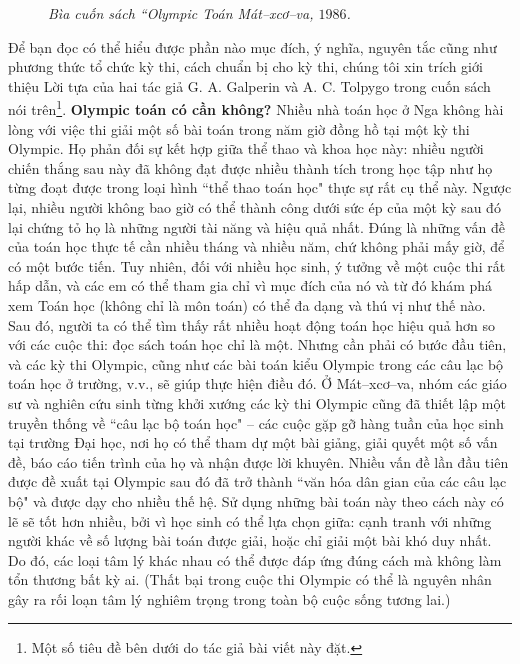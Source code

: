 \begin{multicols}{2}
\begin{figure}[H]
		\caption{\small\textit{\color{cackithi}Bìa cuốn sách ``Olympic Toán Mát--xcơ--va, $1986$.}}
		\vspace*{-10pt}
	\end{figure}
	Để bạn đọc có thể hiểu được phần nào mục đích, ý nghĩa, nguyên tắc cũng như phương thức tổ chức kỳ thi, cách chuẩn bị cho kỳ thi, chúng tôi xin trích giới thiệu Lời tựa của hai tác giả G. A. Galperin và A. C. Tolpygo trong cuốn sách nói trên\footnote[1]{\color{cackithi}Một số tiêu đề bên dưới do tác giả bài viết này đặt.}.
	\vskip 0.1cm
	\textbf{\color{cackithi}Olympic toán có cần không?}
	\vskip 0.1cm 
	Nhiều nhà toán học ở Nga không hài lòng với việc thi giải một số bài toán trong năm giờ đồng hồ tại một kỳ thi Olympic. Họ phản đối sự kết hợp giữa thể thao và khoa học này: nhiều người chiến thắng sau này đã không đạt được nhiều thành tích trong học tập như họ từng đoạt được trong loại hình ``thể thao toán học" thực sự rất cụ thể này. Ngược lại, nhiều người không bao giờ có thể thành công dưới sức ép của một kỳ sau đó lại chứng tỏ họ là những người tài năng và hiệu quả nhất. Đúng là những vấn đề của toán học thực tế cần nhiều tháng và nhiều năm, chứ không phải mấy giờ, để có một bước tiến.
	\vskip 0.1cm
	Tuy nhiên, đối với nhiều học sinh, ý tưởng về một cuộc thi rất hấp dẫn, và các em có thể tham gia chỉ vì mục đích của nó và từ đó khám phá xem Toán học (không chỉ là môn toán) có thể đa dạng và thú vị như thế nào. Sau đó, người ta có thể tìm thấy rất nhiều hoạt động toán học hiệu quả hơn so với các cuộc thi: đọc sách toán học chỉ là một. Nhưng cần phải có bước đầu tiên, và các kỳ thi Olympic, cũng như các bài toán kiểu Olympic trong các câu lạc bộ toán học ở trường, v.v., sẽ giúp thực hiện điều đó.
	\vskip 0.1cm
	Ở Mát--xcơ--va, nhóm các giáo sư và nghiên cứu sinh từng khởi xướng các kỳ thi Olympic cũng đã thiết lập một truyền thống về ``câu lạc bộ toán học" -- các cuộc gặp gỡ hàng tuần của học sinh tại trường Đại học, nơi họ có thể tham dự một bài giảng, giải quyết một số vấn đề, báo cáo tiến trình của họ và nhận được lời khuyên. Nhiều vấn đề lần đầu tiên được đề xuất tại Olympic sau đó đã trở thành ``văn hóa dân gian của các câu lạc bộ" và được dạy cho nhiều thế hệ.
	\vskip 0.1cm
	Sử dụng những bài toán này theo cách này có lẽ sẽ tốt hơn nhiều, bởi vì học sinh có thể lựa chọn giữa: cạnh tranh với những người khác về số lượng bài toán được giải, hoặc chỉ giải một bài khó duy nhất. Do đó, các loại tâm lý khác nhau có thể được đáp ứng đúng cách mà không làm tổn thương bất kỳ ai. (Thất bại trong cuộc thi Olympic có thể là nguyên nhân gây ra rối loạn tâm lý nghiêm trọng trong toàn bộ cuộc sống tương lai.)

\end{multicols}
